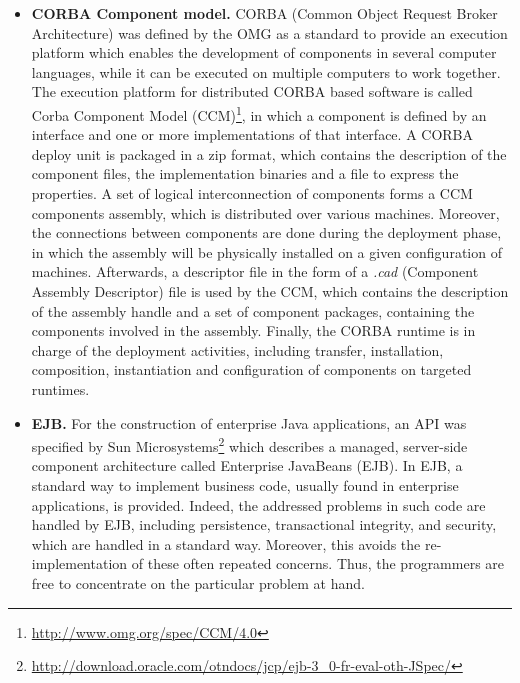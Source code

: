 \begin{itemize}
	\item \textbf{CORBA Component model.}
	CORBA (Common Object Request Broker Architecture) was defined by the OMG as a standard to provide an execution platform which enables the development of components in several computer languages, while it can be executed on multiple computers to work together.
	The execution platform for distributed CORBA based software is called Corba Component Model (CCM)\footnote{\url{http://www.omg.org/spec/CCM/4.0}}, in which a component is defined by an interface and one or more implementations of that interface.
	A CORBA deploy unit is packaged in a zip format, which contains the description of the component files, the implementation binaries and a file to express the properties.
	A set of logical interconnection of components forms a CCM components assembly, which is distributed over various machines.
	Moreover, the connections between components are done during the deployment phase, in which the assembly will be physically installed on a given configuration of machines.
	Afterwards, a descriptor file in the form of a \textit{.cad} (Component Assembly Descriptor) file is used by the CCM, which contains the description of the assembly handle and a set of component packages, containing the components involved in the assembly.
	Finally, the CORBA runtime is in charge of the deployment activities, including transfer, installation, composition, instantiation and configuration of components on targeted runtimes.
	
	\item \textbf{EJB.}
	For the construction of enterprise Java applications, an API was specified by Sun Microsystems\footnote{\url{http://download.oracle.com/otndocs/jcp/ejb-3_0-fr-eval-oth-JSpec/}} which describes a managed, server-side component architecture called Enterprise JavaBeans (EJB).
	In EJB, a standard way to implement business code, usually found in enterprise applications, is provided.
	Indeed, the addressed problems in such code are handled by EJB, including persistence, transactional integrity, and security, which are handled in a standard way.
	Moreover, this avoids the re-implementation of these often repeated concerns.
	Thus, the programmers are free to concentrate on the particular problem at hand.
	

\end{itemize}
